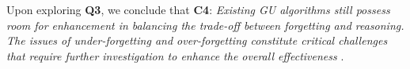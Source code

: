 Upon exploring \textbf{Q3}, we conclude that \textbf{C4}: \textit{Existing GU algorithms still possess room for enhancement in balancing the trade-off between forgetting and reasoning. The issues of under-forgetting and over-forgetting constitute critical challenges that require further investigation to enhance the overall effectiveness} \cite{tradeoff1,tradeoff2}.


\begin{table}[t]
\caption{\textbf{Algorithm complexity analysis for existing prevalent GU studies.}}%
\renewcommand{\arraystretch}{1} %
\end{table}
